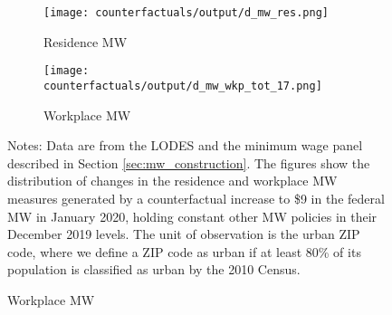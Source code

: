 \begin{figure}[h!]
    \centering
    \caption{Distribution of counterfactual increases in residence and workplace, 
                urban ZIP codes}
    \label{fig:cf_hist_res_and_wkp_mw}
    \begin{subfigure}{0.5\textwidth}
        \caption*{Residence MW}
        \texttt{[image: counterfactuals/output/d\_mw\_res.png]}
    \end{subfigure}%
    \begin{subfigure}{0.5\textwidth}
        \caption*{Workplace MW}
        \texttt{[image: counterfactuals/output/d\_mw\_wkp\_tot\_17.png]}
    \end{subfigure}

    \begin{minipage}{.95\textwidth} \footnotesize
        \vspace{3mm}
        Notes:
        Data are from the LODES and the minimum wage panel described in Section 
        \ref{sec:mw_construction}.
        The figures show the distribution of changes in the residence and 
        workplace MW measures generated by a counterfactual increase to \$9 
        in the federal MW in January 2020, holding constant other MW policies 
        in their December 2019 levels.
        The unit of observation is the urban ZIP code, where we define a ZIP code 
        as urban if at least 80\% of its population is classified as urban by
        the 2010 Census.
    \end{minipage}
\end{figure}
